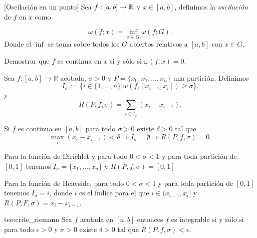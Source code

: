 \begin{definicion}{}[Oscilación en un punto] Sea $f:[a,b]\to\mathbb{R}$ y $x\in [a,b]$, definimos la  \emph{oscilación} de $f$ en $x$ como

\[
 \omega(f;x)=\inf\limits_{x\in G}\omega(f;G).
\]
Donde el $\inf$ se toma sobre todos los $G$ abiertos relativos a $[a,b]$ con $x\in G$.  

 
\end{definicion}

\begin{ejercicio}{}
 Demostrar que $f$ es continua en $x$ si y sólo si $\omega(f;x)=0$.
\end{ejercicio}




\begin{definicion}{} Sea $f:[a,b]\to\mathbb{R}$ acotada, $\sigma>0$ y $P=\{x_0,x_1,\ldots,x_n\}$ una partición. Definimos
\[
 I_{\sigma}:=\{i\in\{1,\ldots,n\}|w(f,[x_{i-1},x_i])\geq\sigma\}.
\]
y
\[
 R(P,f,\sigma)=\sum_{i\in I_{\sigma}}(x_i-x_{i-1}).
\]
\end{definicion}





\begin{proposicion}{} Si $f$ es continua en $[a,b]$ para todo $\sigma>0$ existe $\delta>0$ tal que 
\[
\max_i(x_i-x_{i-1})<\delta\Rightarrow I_{\sigma}=\emptyset\Rightarrow R(P,f,\sigma)=0. 
\]

 
\end{proposicion}

\begin{ejemplo}{} Para la función de Dirichlet y para todo $0<\sigma<1$ y para toda partición de $[0,1]$ tenemos $I_{\sigma}=\{x_1,\ldots,x_n\}$ y $R(P,f,\sigma)=[0,1]$
 
\end{ejemplo}

\begin{ejemplo}{} Para la función de Heavside,   para todo $0<\sigma<1$ y para toda partición de $[0,1]$ tenemos $I_{\sigma}=i$, donde $i$ es el índice para el que $i\in (x_{i-1},x_i]$ y $R(P,F,\sigma)=x_i-x_{i-1}$.
 
\end{ejemplo}

\begin{teorema}{teo:crite_riemann} Sea $f$ acotada en $[a,b]$ entonces $f$ es integrable si y sólo si  para todo $\epsilon>0$ y $\sigma>0$ existe $\delta>0$ tal que $R(P,f,\sigma)<\epsilon$.
\end{teorema}

